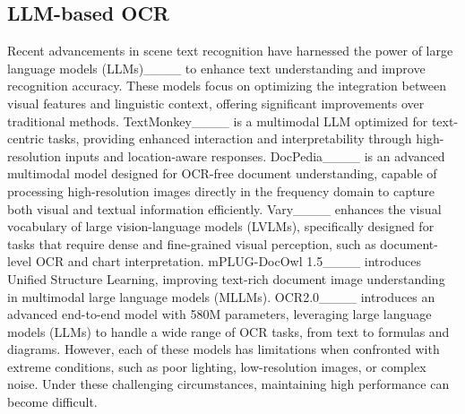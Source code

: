 \subsection{LLM-based OCR} 
Recent advancements in scene text recognition have harnessed the power of large language models (LLMs)____ to enhance text understanding and improve recognition accuracy. These models focus on optimizing the integration between visual features and linguistic context, offering significant improvements over traditional methods. TextMonkey____ is a multimodal LLM optimized for text-centric tasks, providing enhanced interaction and interpretability through high-resolution inputs and location-aware responses. 
DocPedia____ is an advanced multimodal model designed for OCR-free document understanding, capable of processing high-resolution images directly in the frequency domain to capture both visual and textual information efficiently. 
Vary____ enhances the visual vocabulary of large vision-language models (LVLMs), specifically designed for tasks that require dense and fine-grained visual perception, such as document-level OCR and chart interpretation. 
mPLUG-DocOwl 1.5____ introduces Unified Structure Learning, improving text-rich document image understanding in multimodal large language models (MLLMs). 
OCR2.0____ introduces an advanced end-to-end model with 580M parameters, leveraging large language models (LLMs) to handle a wide range of OCR tasks, from text to formulas and diagrams. 
However, each of these models has limitations when confronted with extreme conditions, such as poor lighting, low-resolution images, or complex noise. Under these challenging circumstances, maintaining high performance can become difficult.






